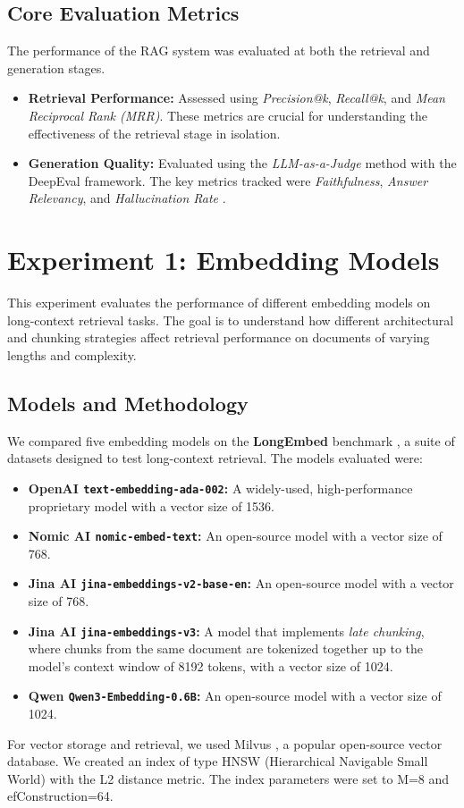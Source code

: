 \subsection{Core Evaluation Metrics}
The performance of the RAG system was evaluated at both the retrieval and generation stages.
\begin{itemize}
\item \textbf{Retrieval Performance:} Assessed using \textit{Precision@k}, \textit{Recall@k}, and \textit{Mean Reciprocal Rank (MRR)}. These metrics are crucial for understanding the effectiveness of the retrieval stage in isolation.
\item \textbf{Generation Quality:} Evaluated using the \textit{LLM-as-a-Judge} method with the DeepEval framework. The key metrics tracked were \textit{Faithfulness}, \textit{Answer Relevancy}, and \textit{Hallucination Rate} \autocite{zheng2023judging}.
\end{itemize}

\section{Experiment 1: Embedding Models}
\label{sec:exp_embedding_models}
This experiment evaluates the performance of different embedding models on long-context retrieval tasks. The goal is to understand how different architectural and chunking strategies affect retrieval performance on documents of varying lengths and complexity.

\subsection{Models and Methodology}
We compared five embedding models on the \textbf{LongEmbed} benchmark \autocite{zhu2024longembedextendingembeddingmodels}, a suite of datasets designed to test long-context retrieval. The models evaluated were:
\begin{itemize}
    \item \textbf{OpenAI \texttt{text-embedding-ada-002}:} A widely-used, high-performance proprietary model with a vector size of 1536.
    \item \textbf{Nomic AI \texttt{nomic-embed-text}:} An open-source model with a vector size of 768.
    \item \textbf{Jina AI \texttt{jina-embeddings-v2-base-en}:} An open-source model with a vector size of 768.
    \item \textbf{Jina AI \texttt{jina-embeddings-v3}:} A model that implements \textit{late chunking}, where chunks from the same document are tokenized together up to the model's context window of 8192 tokens, with a vector size of 1024.
    \item \textbf{Qwen \texttt{Qwen3-Embedding-0.6B}:} An open-source model with a vector size of 1024.
\end{itemize}
For vector storage and retrieval, we used Milvus \autocite{milvus}, a popular open-source vector database. We created an index of type HNSW (Hierarchical Navigable Small World) with the L2 distance metric. The index parameters were set to M=8 and efConstruction=64.

